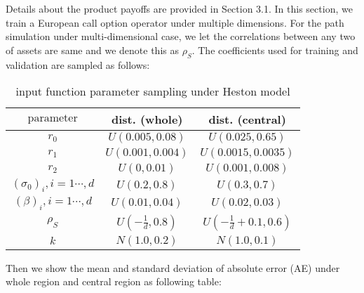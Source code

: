 \documentclass[11pt,a4paper]{article}
\theoremstyle{remark}
\begin{document}
	
	\noindent Details about the product payoffs are provided in Section 3.1. In this section, we train a European call option operator under multiple dimensions. For the path simulation under multi-dimensional case, we let the correlations between any two of assets are same and we denote this as $\rho_S$. The coefficients used for training and validation are sampled as follows:
	\begin{table}[H]
		\centering
		\caption{input function parameter sampling under Heston model}
		\begin{tabular}{ccc}
			\hline
			$\text{parameter}$    &   dist. (whole) & dist. (central) \\
			\hline
			$r_0$   & $U(0.005, 0.08)$  &  $U(0.025, 0.65)$\\
			$r_1$   & $U(0.001, 0.004)$  &  $U(0.0015, 0.0035)$\\
			$r_2$   & $U(0, 0.01)$  &  $U(0.001, 0.008)$\\
			$(\sigma_0)_i, i=1\cdots,d$   & $U(0.2, 0.8)$  &  $U(0.3, 0.7)$\\
			$(\beta)_i, i=1\cdots,d$   & $U(0.01, 0.04)$  &  $U(0.02, 0.03)$\\
			$\rho_S$  & $U(-\frac{1}{d}, 0.8)$ & $U(-\frac{1}{d}+0.1, 0.6)$  \\
			$\textit{k}$ & $N(1.0, 0.2)$ & $N(1.0, 0.1)$\\
			\hline
			
		\end{tabular}%
		\label{tab:dists}%
	\end{table}%
	Then we show the mean and standard deviation of absolute error (AE) under whole region and central region as following table:
\end{document}
